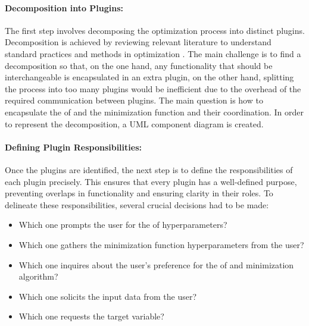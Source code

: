 \documentclass[
  a4paper,  %
  twoside,  %
  bibliography=totoc,
  headsepline,
  cleardoublepage=empty,
  parskip=half,
  draft=false
]{scrbook}
\begin{document}
\paragraph{Decomposition into Plugins:}
The first step involves decomposing the optimization process into distinct plugins.
Decomposition is achieved by reviewing relevant literature to understand standard practices and methods in optimization \cite{Virtanen2020, Nocedal2006, ShalevShwartz2014, Weinan2017}.
The main challenge is to find a decomposition so that, on the one hand, any functionality that should be interchangeable is encapsulated in an extra plugin,
on the other hand, splitting the process into too many plugins would be inefficient due to the overhead of the required communication between plugins.
The main question is how to encapsulate the \gls{of} and the minimization function and their coordination.
In order to represent the decomposition, a UML component diagram is created.

\paragraph{Defining Plugin Responsibilities:}
Once the plugins are identified, the next step is to define the responsibilities of each plugin precisely.
This ensures that every plugin has a well-defined purpose, preventing overlaps in functionality and ensuring clarity in their roles.
To delineate these responsibilities, several crucial decisions had to be made:

\begin{itemize}
  \item Which one prompts the user for the \gls{of} hyperparameters?
  \item Which one gathers the minimization function hyperparameters from the user?
  \item Which one inquires about the user's preference for the \gls{of} and minimization algorithm?
  \item Which one solicits the input data from the user?
  \item Which one requests the target variable?
\end{itemize}
\end{document}

